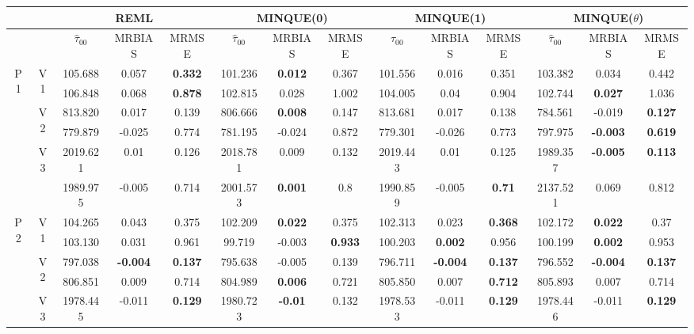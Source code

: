 \documentclass[12pt,a4paper]{article}
\begin{document}
\begin{sidewaystable}[ht]
\centering
{\footnotesize
\begin{tabular}{cc|ccc|ccc|ccc|ccc|}
   & & \multicolumn{3}{c|}{REML}&\multicolumn{3}{c|}{MINQUE(0)}&\multicolumn{3}{c|}{MINQUE(1)}&\multicolumn{3}{c|}{MINQUE($\theta$)}\\ \hline
 &  & $\hat{\tau}_{00}$ & MRBIAS & MRMSE & $\hat{\tau}_{00}$ & MRBIAS & MRMSE & $\hat{\tau}_{00}$ & MRBIAS & MRMSE & $\hat{\tau}_{00}$ & MRBIAS & MRMSE \\ 
  \hline
\multirow{6}{*}{P1} & \multirow{2}{*}{V1} & 105.688 & 0.057 & \textbf{0.332} & 101.236 & \textbf{0.012} & 0.367 & 101.556 & 0.016 & 0.351 & 103.382 & 0.034 & 0.442 \\ 
   &  & 106.848 & 0.068 & \textbf{0.878} & 102.815 & 0.028 & 1.002 & 104.005 & 0.04 & 0.904 & 102.744 & \textbf{0.027} & 1.036 \\ 
   & \multirow{2}{*}{V2} & 813.820 & 0.017 & 0.139 & 806.666 & \textbf{0.008} & 0.147 & 813.681 & 0.017 & 0.138 & 784.561 & -0.019 & \textbf{0.127} \\ 
   &  & 779.879 & -0.025 & 0.774 & 781.195 & -0.024 & 0.872 & 779.301 & -0.026 & 0.773 & 797.975 & \textbf{-0.003} & \textbf{0.619} \\ 
   & \multirow{2}{*}{V3} & 2019.621 & 0.01 & 0.126 & 2018.781 & 0.009 & 0.132 & 2019.443 & 0.01 & 0.125 & 1989.357 & \textbf{-0.005} & \textbf{0.113} \\ 
   &  & 1989.975 & -0.005 & 0.714 & 2001.573 & \textbf{0.001} & 0.8 & 1990.859 & -0.005 & \textbf{0.71} & 2137.521 & 0.069 & 0.812 \\ 
   \hline \hline\multirow{6}{*}{P2} & \multirow{2}{*}{V1} & 104.265 & 0.043 & 0.375 & 102.209 & \textbf{0.022} & 0.375 & 102.313 & 0.023 & \textbf{0.368} & 102.172 & \textbf{0.022} & 0.37 \\ 
   &  & 103.130 & 0.031 & 0.961 & 99.719 & -0.003 & \textbf{0.933} & 100.203 & \textbf{0.002} & 0.956 & 100.199 & \textbf{0.002} & 0.953 \\ 
   & \multirow{2}{*}{V2} & 797.038 & \textbf{-0.004} & \textbf{0.137} & 795.638 & -0.005 & 0.139 & 796.711 & \textbf{-0.004} & \textbf{0.137} & 796.552 & \textbf{-0.004} & \textbf{0.137} \\ 
   &  & 806.851 & 0.009 & 0.714 & 804.989 & \textbf{0.006} & 0.721 & 805.850 & 0.007 & \textbf{0.712} & 805.893 & 0.007 & 0.714 \\ 
   & \multirow{2}{*}{V3} & 1978.445 & -0.011 & \textbf{0.129} & 1980.723 & \textbf{-0.01} & 0.132 & 1978.533 & -0.011 & \textbf{0.129} & 1978.446 & -0.011 & \textbf{0.129} \\ 

\end{tabular}}
\end{sidewaystable}
\end{document}
